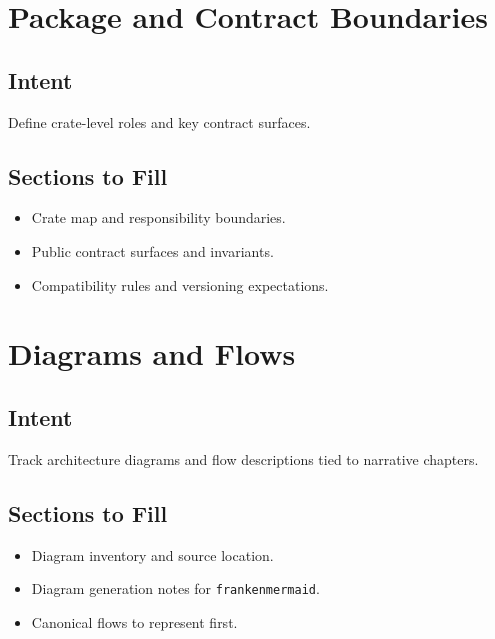 \documentclass[
  letterpaper,
]{report}
\providecommand{\tightlist}{%
  \setlength{\itemsep}{0pt}\setlength{\parskip}{0pt}}
\begin{document}

\chapter{Package and Contract
Boundaries}\label{package-and-contract-boundaries}

\section{Intent}\label{intent-1}

Define crate-level roles and key contract surfaces.

\section{Sections to Fill}\label{sections-to-fill-1}

\begin{itemize}
\tightlist
\item
  Crate map and responsibility boundaries.
\item
  Public contract surfaces and invariants.
\item
  Compatibility rules and versioning expectations.
\end{itemize}


\chapter{Diagrams and Flows}\label{diagrams-and-flows}

\section{Intent}\label{intent-2}

Track architecture diagrams and flow descriptions tied to narrative
chapters.

\section{Sections to Fill}\label{sections-to-fill-2}

\begin{itemize}
\tightlist
\item
  Diagram inventory and source location.
\item
  Diagram generation notes for \texttt{frankenmermaid}.
\item
  Canonical flows to represent first.
\end{itemize}
\end{document}
